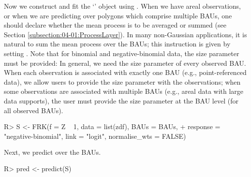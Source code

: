 \documentclass[nojss]{jss}
\newcommand{\class}[1]{`\code{#1}'}
\newcommand{\fct}[1]{\code{#1()}}
\begin{document}
Now we construct and fit the \class{SRE} object using \fct{FRK}. 
When we have areal observations, or when we are predicting over polygons which comprise multiple BAUs, one should declare whether the mean process is to be averaged or summed (see Section \ref{subsection:04-01:ProcessLayer}). 
In many non-Gaussian applications, it is natural to sum the mean process over the BAUs; this instruction is given by setting . 
Note that for binomial and negative-binomial data, the size parameter must be provided: In general, we need the size parameter of every observed BAU. When each observation is associated with exactly one BAU (e.g., point-referenced data), we allow users to provide the size parameter with the observations; when some observations are associated with multiple BAUs (e.g., areal data with large data supports), the user must provide the size parameter at the BAU level (for all observed BAUs).
\begin{Code}
R> S <- FRK(f = Z ~ 1, data = list(zdf), BAUs = BAUs, 
+    response = "negative-binomial", link = "logit", normalise_wts = FALSE)
\end{Code}




Next, we predict over the BAUs. %
\begin{Code}
R> pred <- predict(S)
\end{Code}
\end{document}
